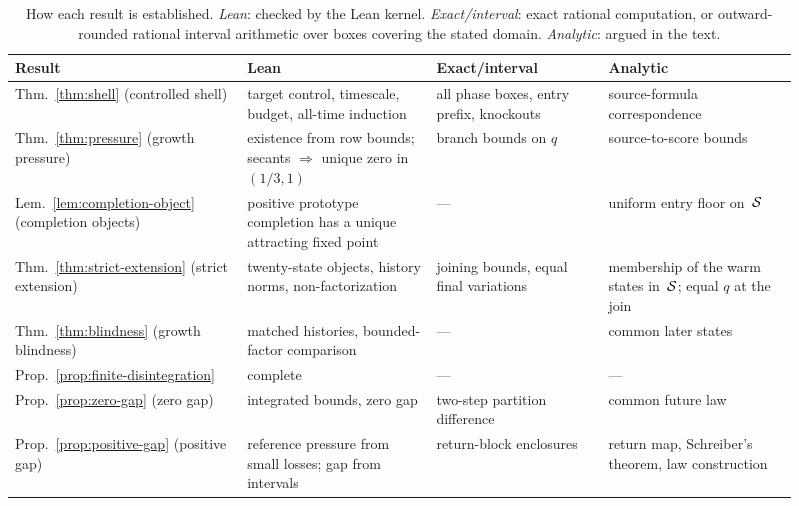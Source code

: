 \begin{table}[t]
\caption{How each result is established. \emph{Lean}: checked by the Lean kernel. \emph{Exact/interval}: exact rational computation, or outward-rounded rational interval arithmetic over boxes covering the stated domain. \emph{Analytic}: argued in the text.}
\label{tbl:verification}
\centering
\small
\begin{tabular}{@{}p{0.27\linewidth} p{0.22\linewidth} p{0.2\linewidth} p{0.22\linewidth}@{}}
\toprule
Result & Lean & Exact/interval & Analytic \\
\midrule
Thm.~\ref{thm:shell} (controlled shell) & target control, timescale, budget, all-time induction & all phase boxes, entry prefix, knockouts & source-formula correspondence \\
Thm.~\ref{thm:pressure} (growth pressure) & existence from row bounds; secants $\Rightarrow$ unique zero in $(1/3,1)$ & branch bounds on $q$ & source-to-score bounds \\
Lem.~\ref{lem:completion-object} (completion objects) & positive prototype completion has a unique attracting fixed point & --- & uniform entry floor on~$\mathcal{S}$ \\
Thm.~\ref{thm:strict-extension} (strict extension) & twenty-state objects, history norms, non-factorization & joining bounds, equal final variations & membership of the warm states in~$\mathcal{S}$; equal $q$ at the join \\
Thm.~\ref{thm:blindness} (growth blindness) & matched histories, bounded-factor comparison & --- & common later states \\
Prop.~\ref{prop:finite-disintegration} & complete & --- & --- \\
Prop.~\ref{prop:zero-gap} (zero gap) & integrated bounds, zero gap & two-step partition difference & common future law \\
Prop.~\ref{prop:positive-gap} (positive gap) & reference pressure from small losses; gap from intervals & return-block enclosures & return map, Schreiber's theorem, law construction \\
\bottomrule
\end{tabular}
\end{table}
